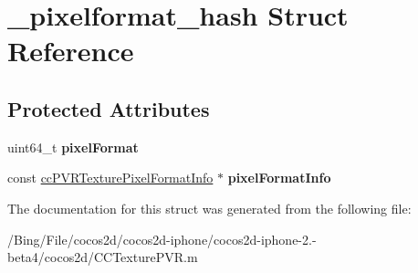\hypertarget{struct__pixelformat__hash}{\section{\-\_\-pixelformat\-\_\-hash Struct Reference}
\label{struct__pixelformat__hash}
}
\subsection*{Protected Attributes}
\begin{DoxyCompactItemize}
\item 
\hypertarget{struct__pixelformat__hash_a732090e35a4f94a6d4d4c6ffae711fe1}{uint64\-\_\-t {\bfseries pixel\-Format}}\label{struct__pixelformat__hash_a732090e35a4f94a6d4d4c6ffae711fe1}

\item 
\hypertarget{struct__pixelformat__hash_aa10a2584052cd57a02028f5f472ff9df}{const \hyperlink{struct__cc_p_v_r_texture_pixel_format_info}{cc\-P\-V\-R\-Texture\-Pixel\-Format\-Info} $\ast$ {\bfseries pixel\-Format\-Info}}\label{struct__pixelformat__hash_aa10a2584052cd57a02028f5f472ff9df}

\end{DoxyCompactItemize}


The documentation for this struct was generated from the following file\-:\begin{DoxyCompactItemize}
\item 
/\-Bing/\-File/cocos2d/cocos2d-\/iphone/cocos2d-\/iphone-\/2.-\/beta4/cocos2d/C\-C\-Texture\-P\-V\-R.\-m\end{DoxyCompactItemize}
